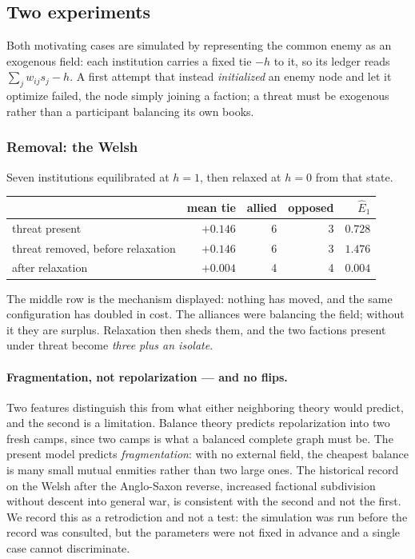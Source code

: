 \documentclass[11pt]{article}
\numberwithin{equation}{section}
\theoremstyle{plain}
\theoremstyle{definition}
\theoremstyle{remark}
\begin{document}
\subsection{Two experiments}\label{ad:sub:experiments}

Both motivating cases are simulated by representing the common enemy as
an exogenous field: each institution carries a fixed tie $-h$ to it, so
its ledger reads $\sum_j w_{ij}s_j-h$. A first attempt that instead
\emph{initialized} an enemy node and let it optimize failed, the node
simply joining a faction; a threat must be exogenous rather than a
participant balancing its own books.

\subsubsection{Removal: the Welsh}\label{ad:subsub:welsh}

Seven institutions equilibrated at $h=1$, then relaxed at $h=0$ from
that state.

\begin{center}\small
\begin{tabular}{@{}lrrrr@{}}
\toprule
& mean tie & allied & opposed & $\hat E_1$\\
\midrule
threat present & $+0.146$ & 6 & 3 & $0.728$\\
threat removed, before relaxation & $+0.146$ & 6 & 3 & $1.476$\\
after relaxation & $+0.004$ & 4 & 4 & $0.004$\\
\bottomrule
\end{tabular}
\end{center}

The middle row is the mechanism displayed: nothing has moved, and the
same configuration has doubled in cost. The alliances were balancing the
field; without it they are surplus. Relaxation then sheds them, and the
two factions present under threat become \emph{three plus an isolate}.

\paragraph{Fragmentation, not repolarization --- and no flips.}\label{ad:rem:welshreading}
Two features distinguish this from what either neighboring theory would
predict, and the second is a limitation. Balance theory predicts repolarization into two fresh camps, since two
camps is what a balanced complete graph must be. The present model
predicts \emph{fragmentation}: with no external field, the cheapest
balance is many small mutual enmities rather than two large ones. The
historical record on the Welsh after the Anglo-Saxon reverse, increased factional subdivision without descent into general war, is
consistent with the second and not the first. We record this as a
retrodiction and not a test: the simulation was run before the record
was consulted, but the parameters were not fixed in advance and a single
case cannot discriminate.
\end{document}
